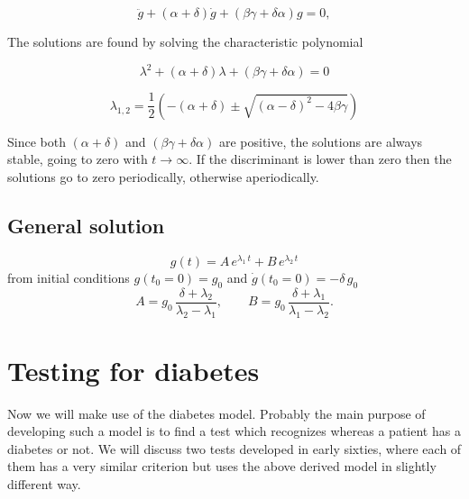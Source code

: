 \documentclass{article}
\begin{document}
\begin{equation}
	\label{Eq:secondOrderDE}
	\ddot g+(\alpha+\delta)\dot g+(\beta \gamma+\delta \alpha)g=0,
\end{equation}

The solutions are found by solving the characteristic polynomial

\begin{equation}
	\label{Eq:charEqn}
	\lambda^2+(\alpha+\delta)\lambda+(\beta\gamma+\delta\alpha)=0
\end{equation}

\begin{equation}
	\label{Eq:rootsOfCharEqn}
	\lambda_{1,2}=\frac{1}{2}\left(-(\alpha+\delta)\pm \sqrt{(\alpha-\delta)^2-4\beta\gamma}\right)
\end{equation}

Since both $(\alpha+\delta)$ and $(\beta\gamma+\delta\alpha)$ are positive, the solutions are always stable, going to zero with $t\rightarrow \infty$. If the discriminant is lower than zero then the solutions go to zero periodically, otherwise aperiodically.

\subsection*{General solution}
\begin{equation}
	\label{Eq:genSol}
	g(t) = A\,e^{\lambda_1 \, t} + B\,e^{\lambda_2 \, t}
\end{equation}
from initial conditions $g(t_0=0) = g_0$ and $\dot{g}(t_0=0) = -\delta \, g_0$
\begin{equation*}
	\label{Eq:genSolParams}
	A = g_0\,\frac{\delta+\lambda_2}{\lambda_2-\lambda_1}, \qquad B = g_0\,\frac{\delta+\lambda_1}{\lambda_1-\lambda_2}.
\end{equation*}



\section{Testing for diabetes}
Now we will make use of the diabetes model. Probably the main purpose of developing such a model is to find a test which recognizes whereas a patient has a diabetes or not. We will discuss two tests developed in early sixties, where each of them has a very similar criterion but uses the above derived model in slightly different way.
\end{document}
